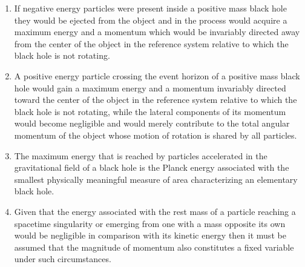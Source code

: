 \documentclass[notitlepage,12pt]{report}
\begin{document}
\begin{enumerate}
\item If negative energy particles were present inside a positive mass black hole they would be ejected from the object and in the process would acquire a maximum energy and a momentum which would be invariably directed away from the center of the object in the reference system relative to which the black hole is not rotating.

\item A positive energy particle crossing the event horizon of a positive mass black hole would gain a maximum energy and a momentum invariably directed toward the center of the object in the reference system relative to which the black hole is not rotating, while the lateral components of its momentum would become negligible and would merely contribute to the total angular momentum of the object whose motion of rotation is shared by all particles.

\item The maximum energy that is reached by particles accelerated in the gravitational field of a black hole is the Planck energy associated with the smallest physically meaningful measure of area characterizing an elementary black hole.

\item Given that the energy associated with the rest mass of a particle reaching a spacetime singularity or emerging from one with a mass opposite its own would be negligible in comparison with its kinetic energy then it must be assumed that the magnitude of momentum also constitutes a fixed variable under such circumstances.


\end{enumerate}
\end{document}
